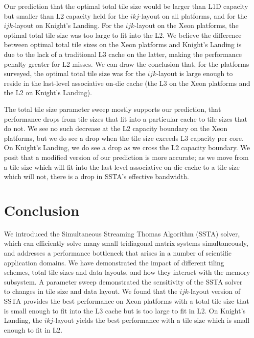 \documentclass[10pt, conference, compsocconf]{IEEEtran}
\begin{document}
Our prediction that the optimal total tile size would be larger than L1D
  capacity but smaller than L2 capacity held for the \(ikj\)-layout on all
  platforms, and for the \(ijk\)-layout on Knight's Landing.
For the \(ijk\)-layout on the Xeon platforms, the optimal total tile size was
  too large to fit into the L2.
We believe the difference between optimal total tile sizes on the Xeon
  platforms and Knight's Landing is due to the lack of a traditional L3 cache
  on the latter, making the performance penalty greater for L2 misses.
We can draw the conclusion that, for the platforms surveyed, the optimal total
  tile size was for the \(ijk\)-layout is large enough to reside in the
  last-level associative on-die cache (the L3 on the Xeon platforms and the L2
  on Knight's Landing).

The total tile size parameter sweep mostly supports our prediction, that 
  performance drops from tile sizes that 
  fit into a particular cache to tile sizes that do not.
We see no such decrease at the L2 capacity boundary on the Xeon platforms, but
  we do see a drop when the tile size exceeds L3 capacity per core.
On Knight's Landing, we do see a drop as we cross the L2 capacity boundary.
We posit that a modified version of our prediction is more accurate; as we move
  from a tile size which will fit into the last-level associative on-die cache
  to a tile size which will not, there is a drop in SSTA's effective bandwidth.

\section{Conclusion}
\label{sec:conclusion}


We introduced the Simultaneous Streaming Thomas Algorithm (SSTA) solver, which
  can efficiently solve many small tridiagonal matrix systems simultaneously, 
  and addresses a performance bottleneck
  that arises in a number of scientific application domains.
We have demonstrated the impact of different tiling schemes, total tile sizes
  and data layouts, and how they interact with the memory subsystem.
A parameter sweep demonstrated the sensitivity of the SSTA solver to changes in
  tile size and data layout.
We found that the \(ijk\)-layout version of SSTA provides the best performance
  on Xeon platforms with a total tile size that is small enough to fit into 
  the L3 cache but is too large to fit in L2.
On Knight's Landing, the \(ikj\)-layout yields the best performance with a
  tile size which is small enough to fit in L2.
\end{document}
